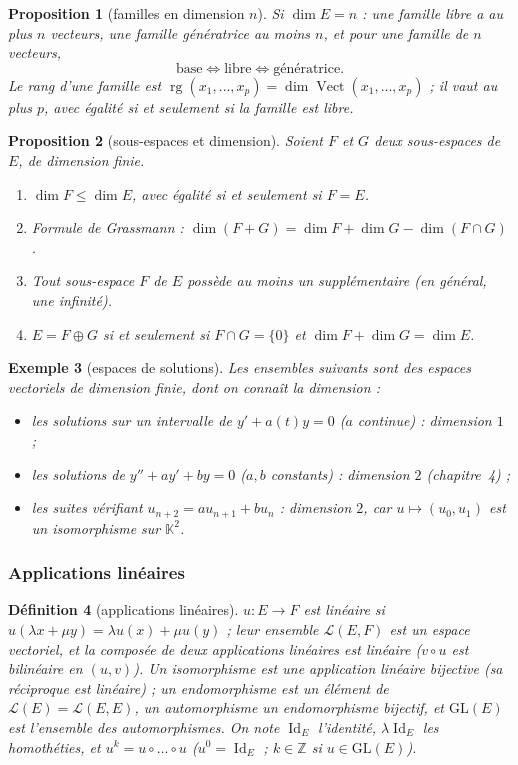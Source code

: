 \documentclass[a4paper,11pt]{article}
\numberwithin{equation}{section}
\numberwithin{figure}{section}
\numberwithin{table}{section}
\theoremstyle{enonce}
\newtheorem{definition}{Définition}[section]
\newtheorem{proposition}[definition]{Proposition}
\theoremstyle{exemple}
\newtheorem{exemple}[definition]{Exemple}
\theoremstyle{remarque}
\newcommand{\K}{\mathbb{K}}
\newcommand{\Z}{\mathbb{Z}}
\newcommand{\LE}{\mathcal{L}(E)}
\newcommand{\rg}{\operatorname{rg}}
\newcommand{\vect}{\operatorname{Vect}}
\newcommand{\Id}{\operatorname{Id}}
\begin{document}
\begin{proposition}[familles en dimension $n$]\label{r:base}
Si $\dim E=n$ : une famille libre a au plus $n$ vecteurs, une famille génératrice au moins $n$, et pour une famille de
\emph{$n$ vecteurs},
\[\text{base}\iff\text{libre}\iff\text{génératrice}.\]
Le \emph{rang} d'une famille est $\rg(x_1,\dots,x_p)=\dim\vect(x_1,\dots,x_p)$ ; il vaut au plus $p$, avec égalité si et
seulement si la famille est libre.
\end{proposition}

\begin{proposition}[sous-espaces et dimension]\label{r:sev}
Soient $F$ et $G$ deux sous-espaces de $E$, de dimension finie.
\begin{enumerate}
\item $\dim F\leq\dim E$, avec égalité si et seulement si $F=E$.
\item \emph{Formule de Grassmann :} $\dim(F+G)=\dim F+\dim G-\dim(F\cap G)$.
\item Tout sous-espace $F$ de $E$ possède au moins un supplémentaire (en général, une infinité).
\item $E=F\oplus G$ si et seulement si $F\cap G=\{0\}$ et $\dim F+\dim G=\dim E$.
\end{enumerate}
\end{proposition}

\begin{exemple}[espaces de solutions]
Les ensembles suivants sont des espaces vectoriels de dimension finie, dont on connaît la dimension :
\begin{itemize}
\item les solutions sur un intervalle de $y'+a(t)y=0$ ($a$ continue) : dimension $1$ ;
\item les solutions de $y''+ay'+by=0$ ($a,b$ constants) : dimension $2$ (chapitre~4) ;
\item les suites vérifiant $u_{n+2}=au_{n+1}+bu_n$ : dimension $2$, car $u\mapsto(u_0,u_1)$ est un isomorphisme sur $\K^2$.
\end{itemize}
\end{exemple}

\subsubsection*{Applications linéaires}

\begin{definition}[applications linéaires]
$u:E\to F$ est \emph{linéaire} si $u(\lambda x+\mu y)=\lambda u(x)+\mu u(y)$ ; leur ensemble $\mathcal L(E,F)$ est un espace
vectoriel, et la composée de deux applications linéaires est linéaire ($v\circ u$ est bilinéaire en $(u,v)$). Un
\emph{isomorphisme} est une application linéaire bijective (sa réciproque est linéaire) ; un \emph{endomorphisme} est un élément
de $\LE=\mathcal L(E,E)$, un \emph{automorphisme} un endomorphisme bijectif, et $\mathrm{GL}(E)$ est l'ensemble des
automorphismes. On note $\Id_E$ l'identité, $\lambda\Id_E$ les homothéties, et $u^k=u\circ\dots\circ u$ ($u^0=\Id_E$ ; $k\in\Z$
si $u\in\mathrm{GL}(E)$).
\end{definition}
\end{document}

